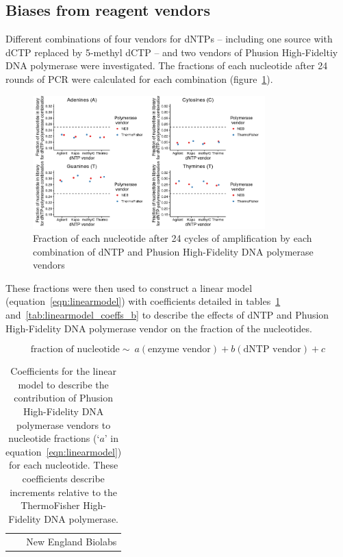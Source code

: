 \documentclass[parskip=full, numbers=noenddot]{scrbook}
\begin{document}
\subsection{Biases from reagent vendors}
\label{ssec:pcrbias_result_reagent}

Different combinations of four vendors for dNTPs -- including one source with dCTP replaced by 5-methyl dCTP -- and two vendors of Phusion High-Fideltiy DNA polymerase were investigated.  The fractions of each nucleotide after 24 rounds of PCR were calculated for each combination (figure~\ref{fig:linearmodel_nt}).

\begin{figure}[htbp]
  \centering
  \includegraphics[width=0.8\textwidth]{linearmodel_acgt}
  \caption{Fraction of each nucleotide after 24 cycles of amplification by each combination of dNTP and Phusion High-Fidelity DNA polymerase vendors}
  \label{fig:linearmodel_nt}
\end{figure}

These fractions were then used to construct a linear model (equation~\ref{eqn:linearmodel}) with coefficients detailed in tables~\ref{tab:linearmodel_coeffs_a} and~\ref{tab:linearmodel_coeffs_b} to describe the effects of dNTP and Phusion High-Fidelity DNA polymerase vendor on the fraction of the nucleotides.

\begin{equation}
  \label{eqn:linearmodel}
  \textrm{fraction of nucleotide} \sim\ a (\textrm{enzyme vendor}) + b (\textrm{dNTP vendor}) + c
\end{equation}

\begin{table}[h]
  \centering
  \begin{tabular}{r}
     \\
    New England Biolabs\\
  \end{tabular}%
  \caption{Coefficients for the linear model to describe the contribution of Phusion High-Fidelity DNA polymerase vendors to nucleotide fractions (`$a$' in equation~\ref{eqn:linearmodel}) for each nucleotide.  These coefficients describe increments relative to the ThermoFisher High-Fidelity DNA polymerase.}
  \label{tab:linearmodel_coeffs_a}
\end{table}
\end{document}
